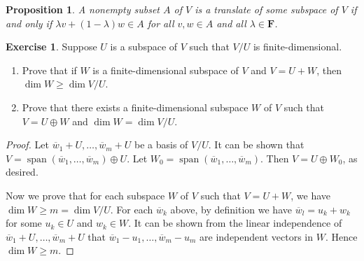 \documentclass[nofonts,colorlinks]{tufte-handout}
\theoremstyle{plain} %
\newtheorem{prop}[thm]{Proposition}
\theoremstyle{definition}
\newtheorem{exer}[thm]{Exercise}
\theoremstyle{remark}
\newcommand{\bra}[1]{\mathopen{}\left(#1\right)}
\renewcommand{\phi}{\varphi}
\newcommand{\F}{\mathbf{F}}
\renewcommand{\L}{\mathcal{L}}
\DeclareMathOperator{\spn}{span}
\begin{document}

	

\begin{prop}\label{prop: test for translate}
	A nonempty subset $A$ of $V$ is a translate of some subspace of $V$ if and only if $\lambda v+\bra{1-\lambda}w\in A$ for all $v,w\in A$ and all $\lambda\in\F$.
\end{prop}


\begin{exer}
	Suppose $U$ is a subspace of $V$ such that $V/U$ is finite-dimensional.
	\begin{enumerate}
		\item Prove that if $W$ is a finite-dimensional subspace of $V$ and $V=U+W$, then $\dim W\geq\dim V/U$.
		\item Prove that there exists a finite-dimensional subspace $W$ of $V$ such that $V=U\oplus W$ and $\dim W=\dim V/U$.
	\end{enumerate}
\end{exer}
\begin{proof}
	Let $\overline{w}_1+U,\dots,\overline{w}_m+U$ be a basis of $V/U$. It can be shown that $V=\spn(\overline{w}_1,\dots,\overline{w}_m)\oplus U$. Let $W_0=\spn(\overline{w}_1,\dots,\overline{w}_m)$. Then $V=U\oplus W_0$, as desired.

	Now we prove that for each subspace $W$ of $V$ such that $V=U+W$, we have $\dim W\geq m=\dim V/U$. For each $\overline{w}_k$ above, by definition we have $\overline{w}_l=u_k+w_k$ for some $u_k\in U$ and $w_k\in W$. It can be shown from the linear independence of $\overline{w}_1+U,\dots,\overline{w}_m+U$ that $\overline{w}_1-u_1,\dots,\overline{w}_m-u_m$ are independent vectors in $W$. Hence $\dim W\geq m$.
\end{proof}
\end{document}
